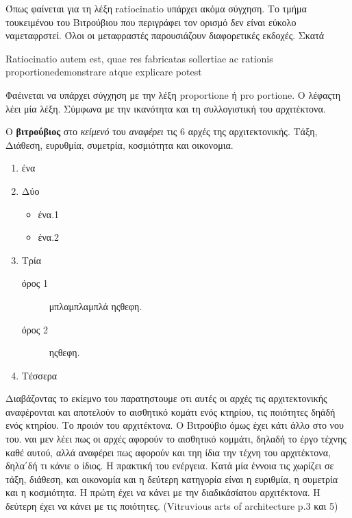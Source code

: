 Όπως φαίνεται για τη λέξη ratiocinatio υπάρχει ακόμα σύγχηση. Το τμήμα τουκειμένου του Βιτρούβιου που περιγράφει τον ορισμό δεν είναι εύκολο ναμεταφρστεί. Όλοι οι μεταφραστές παρουσιάζουν διαφορετικές εκδοχές. Σκατά

Ratiocinatio autem est, quae res fabricatas sollertiae ac rationis proportionedemonstrare atque explicare potest

Φαέινεται να υπάρχει σύγχηση με την λέξη proportione ή pro portione. Ο λέφαςτη λέει μία λέξη. Σύμφωνα με την ικανότητα και τη συλλογιστική του αρχιτέκτονα.


  
  Ο {\color{red}\textbf{βιτρούβιος}} στο \emph{κείμενό} του \textit{αναφέρει} τις 6 αρχές της αρχιτεκτονικής. Τάξη, Διάθεση, ευρυθμία, συμετρία, κοσμιότητα και οικονομια. \cite{scranton_vitruvius_1974, vitruvius-lefas}
  
\begin{enumerate}[noitemsep] %
  \item ένα
  \item Δύο
  
  \begin{itemize}
    \item ένα.1
    \item ένα.2
  \end{itemize}
  
  \item Τρία
  
    \begin{description}
      \item[όρος 1] μπλαμπλαμπλά ηςθεφη.
      \item[όρος 2] ηςθεφη.
    \end{description}
  
  \item Τέσσερα
\end{enumerate}

Διαβάζοντας το εκίεμνο του παρατηστουμε οτι αυτές οι αρχές τις αρχιτεκτονικής 
αναφέρονται και αποτελούν το αισθητικό κομάτι ενός κτηρίου, τις ποιότητες δηάδή 
ενός κτηρίου. Το προιόν του αρχιτέκτονα. Ο Βιτρούβιο όμως έχει κάτι άλλο στο 
νου του. ναι μεν λέει πως οι αρχές αφορούν το αισθητικό κομμάτι, δηλαδή το έργο 
τέχνης καθέ αυτού, αλλά αναφέρει πως αφορούν και τηη ίδια την τέχνη του 
αρχιτέκτονα, δηλα΄δή τι κάνιε ο ίδιος. Η πρακτική του ενέργεια. Κατά μία έννοια 
τις χωρίζει σε τάξη, διάθεση, και οικονομία και η δεύτερη κατηγορία είναι η 
ευριθμία, η συμετρία και η κοσμιότητα. Η πρώτη έχει να κάνει με την 
διαδικάσίατου αρχιτέκτονα. Η δεύτερη έχει να κάνει με τις ποιότητες. 
(Vitruvious arts of architecture p.3 και 5)
  
